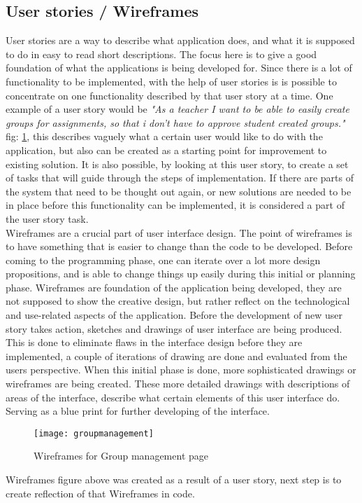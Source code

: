 \subsection{User stories / Wireframes}
User stories are a way to describe what application does, and what it is supposed to do in easy to read short descriptions. The focus here is to give a good foundation of what the applications is being developed for. Since there is a lot of functionality to be implemented, with the help of user stories is is possible to concentrate on one functionality described by that user story at a time. One example of a user story would be \emph{"As a teacher I want to be able to easily create groups for assignments, so that i don't have to approve student created groups."} fig: \ref{fig:groupmanagement}, this describes vaguely what a certain user would like to do with the application, but also can be created as a starting point for improvement to existing solution. It is also possible, by looking at this user story, to create a set of tasks that will guide through the steps of implementation. If there are parts of the system that need to be thought out again, or new solutions are needed to be in place before this functionality can be implemented, it is considered a part of the user story task.
\\Wireframes are a crucial part of user interface design. The point of wireframes is to have something that is easier to change than the code to be developed. Before coming to the programming phase, one can iterate over a lot more design propositions, and is able to change things up easily during this initial or planning phase. Wireframes are foundation of the application being developed, they are not supposed to show the creative design, but rather reflect on the technological and use-related aspects of the application. Before the development of new user story takes action, sketches and drawings of user interface are being produced. This is done to eliminate flaws in the interface design before they are implemented, a couple of iterations of drawing are done and evaluated from the users perspective. When this initial phase is done, more sophisticated drawings or wireframes are being created. These more detailed drawings with descriptions of areas of the interface, describe what certain elements of this user interface do. Serving as a blue print for further developing of the interface.
\newpage
\begin{figure}[h]
  \centering
  \texttt{[image: groupmanagement]}
  \caption{Wireframes for Group management page}
  \label{fig:groupmanagement}
\end{figure}
Wireframes figure above was created as a result of a user story, next step is to create reflection of that Wireframes in code.

